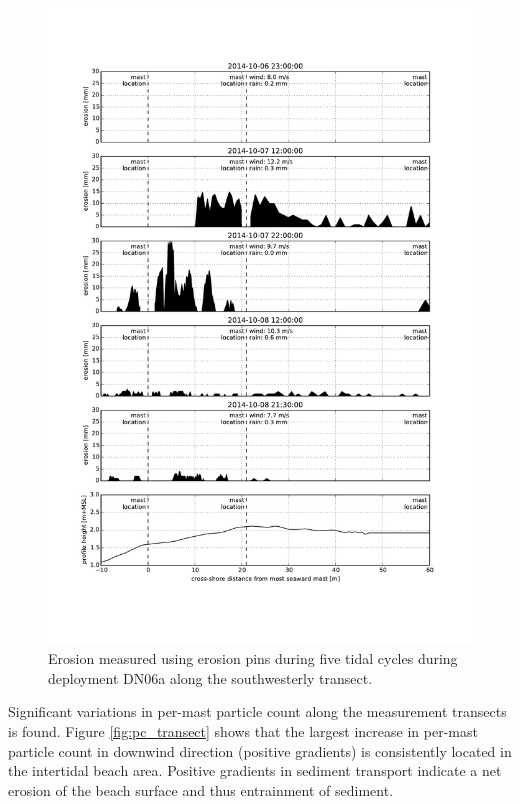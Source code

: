 \begin{figure}
 \centering
  \includegraphics[width=\columnwidth]{../Figures/nails}
  \caption{Erosion measured using erosion pins during five tidal
    cycles during deployment DN06a along the southwesterly transect.}
  \label{fig:nails}
\end{figure}

Significant variations in per-mast particle count along the
measurement transects is found. Figure \ref{fig:pc_transect} shows
that the largest increase in per-mast particle count in downwind
direction (positive gradients) is consistently located in the
intertidal beach area. Positive gradients in sediment transport
indicate a net erosion of the beach surface and thus entrainment of
sediment. 

